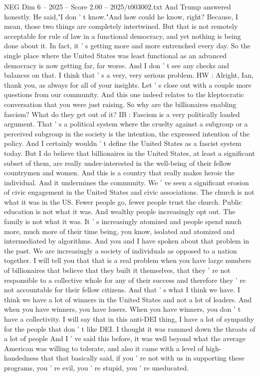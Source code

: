 \begin{textsample}{NEG Dim 6 – 2025 – Score 2.00 – 2025/t003002.txt}
And Trump answered honestly.
He said,"I don ' t know."And how could he know, right?
Because, I mean, those two things are completely intertwined.
But that is not remotely acceptable for rule of law in a functional democracy, and yet nothing is being done about it.
In fact, it ' s getting more and more entrenched every day.
So the single place where the United States was least functional as an advanced democracy is now getting far, far worse.
And I don ' t see any checks and balances on that.
I think that ' s a very, very serious problem.
HW : Alright, Ian, thank you, as always for all of your insights.
Let ' s close out with a couple more questions from our community.
And this one indeed relates to the kleptocratic conversation that you were just raising.
So why are the billionaires enabling fascism?
What do they get out of it?
IB : Fascism is a very politically loaded argument.
That ' s a political system where the cruelty against a subgroup or a perceived subgroup in the society is the intention, the expressed intention of the policy.
And I certainly wouldn ' t define the United States as a fascist system today.
But I do believe that billionaires in the United States, at least a significant subset of them, are really under-interested in the well-being of their fellow countrymen and women.
And this is a country that really makes heroic the individual.
And it undermines the community.
We ' ve seen a significant erosion of civic engagement in the United States and civic associations.
The church is not what it was in the US.
Fewer people go, fewer people trust the church.
Public education is not what it was.
And wealthy people increasingly opt out.
The family is not what it was.
It ' s increasingly atomized and people spend much more, much more of their time being, you know, isolated and atomized and intermediated by algorithms.
And you and I have spoken about that problem in the past.
We are increasingly a society of individuals as opposed to a nation together.
I will tell you that that is a real problem when you have large numbers of billionaires that believe that they built it themselves, that they ' re not responsible to a collective whole for any of their success and therefore they ' re not accountable for their fellow citizens.
And that ' s what I think we have.
I think we have a lot of winners in the United States and not a lot of leaders.
And when you have winners, you have losers.
When you have winners, you don ' t have a collectivity.
I will say that in this anti-DEI thing, I have a lot of sympathy for the people that don ' t like DEI.
I thought it was rammed down the throats of a lot of people And I ' ve said this before, it was well beyond what the average American was willing to tolerate, and also it came with a level of high-handedness that that basically said, if you ' re not with us in supporting these programs, you ' re evil, you ' re stupid, you ' re uneducated.

\end{textsample}
